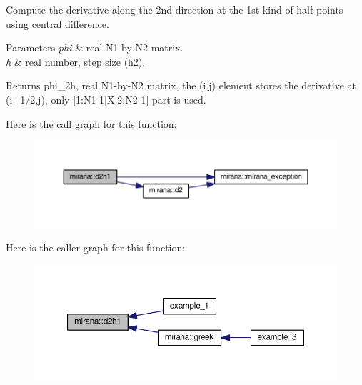 Compute the derivative along the 2nd direction at the 1st kind of half points using central difference. 


\begin{DoxyParams}{Parameters}
{\em phi} & real N1-\/by-\/\-N2 matrix. \\
\hline
{\em h} & real number, step size (h2). \\
\hline
\end{DoxyParams}
\begin{DoxyReturn}{Returns}
phi\-\_\-2h, real N1-\/by-\/\-N2 matrix, the (i,j) element stores the derivative at (i+1/2,j), only \mbox{[}1\-:N1-\/1\mbox{]}X\mbox{[}2\-:N2-\/1\mbox{]} part is used. 
\end{DoxyReturn}


Here is the call graph for this function\-:\nopagebreak
\begin{figure}[H]
\begin{center}
\leavevmode
\includegraphics[width=350pt]{classmirana_a9341f957abd27c5132c557ae873055bd_cgraph}
\end{center}
\end{figure}




Here is the caller graph for this function\-:\nopagebreak
\begin{figure}[H]
\begin{center}
\leavevmode
\includegraphics[width=350pt]{classmirana_a9341f957abd27c5132c557ae873055bd_icgraph}
\end{center}
\end{figure}


